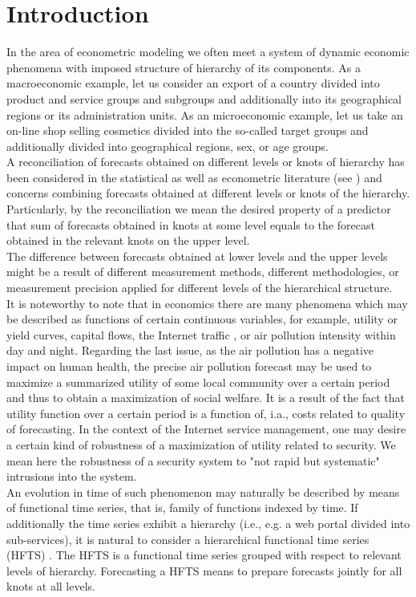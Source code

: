 \documentclass[12pt,a4paper]{article}
\numberwithin{equation}{section}
\begin{document}
\section{Introduction}
\label{intro}
In the area of econometric modeling we often meet a system of dynamic economic phenomena with imposed structure of hierarchy of its components. As a macroeconomic example, let us consider an export of a country divided into product and service groups and subgroups and additionally into its geographical regions or its administration units. As an microeconomic example, let us take an on-line shop selling cosmetics divided into the so-called target groups and additionally divided into geographical regions, sex, or age groups.\\
A reconciliation of forecasts obtained on different levels or knots of hierarchy has been considered in the statistical as well as econometric literature (see \cite{Hyndman2011,Kahn,Kohn,Weale}) and concerns combining forecasts obtained at different levels or knots of the hierarchy. Particularly, by the reconciliation we mean the desired property of a predictor that sum of forecasts obtained in knots at some level equals to the forecast obtained in the relevant knots on the upper level.\\ The difference between forecasts obtained at lower levels and the upper levels might be a result of different measurement methods, different methodologies, or measurement precision applied for different levels of the hierarchical structure.\\
It is noteworthy to note that in economics there are many phenomena which may be described as functions of certain continuous variables, for example, utility or yield curves, capital flows, the Internet traffic \cite{Horvath,Bocian,StatPap,Ramsay}, or air pollution intensity within day and night. 
Regarding the last issue, as the air pollution has a negative impact on human health, the precise air pollution forecast may be used to maximize a summarized utility of some local community over a
certain period \cite{cejeme} and thus to obtain a maximization of social welfare. It is a result of the fact that utility function over a certain period is a function of, i.a., costs related to quality of forecasting. 
In the context of the Internet service management, one may desire a certain kind of robustness of a maximization of utility related to security. We mean here the robustness of a security system to "not rapid but systematic" intrusions into the system.  \\ An evolution in time of such phenomenon may naturally be described by means of functional time series, that is, family of functions indexed by time. If additionally the time series exhibit a hierarchy (i.e., e.g. a web portal divided into sub-services), it is natural to consider a hierarchical functional time series (HFTS) \cite{Shang}. The HFTS is a functional time series grouped with respect to relevant levels of hierarchy. Forecasting a HFTS means to prepare forecasts jointly for all knots at all levels. \\
\end{document}
